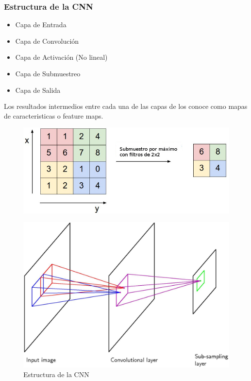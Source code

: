 \documentclass[12pt,center]{beamer}
\begin{document}
\begin{frame}
  \frametitle{Estructura de la CNN}
    \begin{itemize}
     \item Capa de Entrada
     \item Capa de Convolución
     \item Capa de Activación (No lineal)
     \item Capa de Submuestreo
     \item Capa de Salida
    \end{itemize}
  Los resultados intermedios entre cada una de las capas de los conoce como mapas de caracteristicas o feature maps.
  \begin{figure}[H]
    \begin{center}
      \includegraphics[width=0.8\linewidth]{./img/stanford_maxpool_spanish.jpeg}
    \end{center}
  \end{figure}
      
  \begin{figure}[h]
    \begin{center}
    \includegraphics[width=0.8\linewidth]{./img/bishop_cnn.jpg}
    \end{center}
    \caption{Estructura de la CNN}
  \end{figure}
\end{frame}
\end{document}
